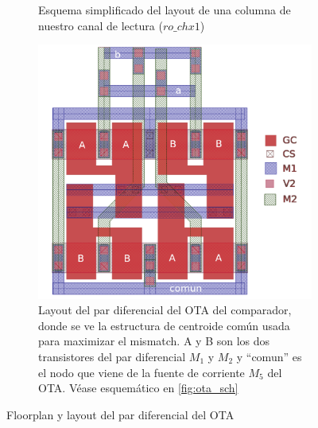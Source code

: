 \begin{figure}[h]
	\centering
	\begin{subfigure}{0.45\textwidth}
		
		\caption{Esquema simplificado del layout de una columna de nuestro canal de lectura ($ro\_chx1$)}
		\label{fig:ro_chx1}
	\end{subfigure}
	\qquad
	\begin{subfigure}{0.45\textwidth}
		\includegraphics[width=\textwidth]{img/OTA_simple_layout.png}
		\caption{Layout del par diferencial del OTA del comparador, donde se ve
		la estructura de centroide común usada para maximizar el mismatch.
		A y B son los dos transistores del par diferencial $M_1$ y $M_2$ y ``comun'' es
		el nodo que viene de la fuente de corriente $M_5$ del OTA. Véase
		esquemático en \ref{fig:ota_sch}}
		\label{fig:ota_simple_layout}
	\end{subfigure}
	\caption{Floorplan y layout del par diferencial del OTA}
\end{figure}
